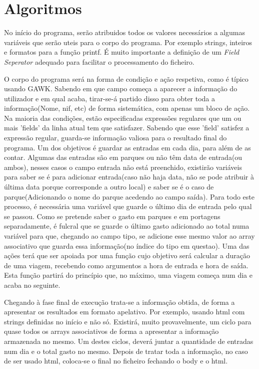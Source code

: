 \documentclass{report}
\def\fs{\emph{Field Seperator}\xspace}
\begin{document}
\section{Algoritmos}
No início do programa, serão atribuidos todos os valores necessários a algumas variáveis que serão uteis para o corpo do programa.
Por exemplo strings, inteiros e formatos para a função printf.
É muito importante a definição de um \fs adequado para facilitar o processamento do ficheiro.\par
O corpo do programa será na forma de condição e ação respetiva, como é típico usando GAWK.
Sabendo em que campo começa a aparecer a informação do utilizador e em qual acaba, tirar-se-á partido disso para obter toda a 
informação(Nome, nif, etc) de forma sistemática, com apenas um bloco de ação.
Na maioria das condições, estão especificadas expressões regulares que um ou mais 'fields' da linha atual tem que satisfazer. 
Sabendo que esse 'field' satisfez a expressão regular, guarda-se informação valiosa para o resultado final do programa. Um dos objetivos é guardar as entradas em cada dia, para além de as contar.
Algumas das entradas são em parques ou não têm data de entrada(ou ambos), nesses casos o campo entrada não
está preenchido, existirão variáveis para saber se é para adicionar entrada(caso não haja data, não se pode atribuir à última data porque corresponde a outro local) e saber se é o caso de parque(Adicionando o nome do 
parque acedendo ao campo saída). Para todo este processo, é necessária uma variável que guarde o último dia de entrada pelo qual se passou.
Como se pretende saber o gasto em parques e em portagens separadamente, é 
fulcral que se guarde o último gasto adicionado ao total numa variável para que, chegando ao campo tipo, se adicione esse mesmo valor 
ao array associativo que guarda essa informação(no índice do tipo em questao).
Uma das ações terá que ser apoiada por uma
função cujo objetivo será calcular a duração de uma viagem, recebendo como
argumentos a hora de entrada e hora de saída. Esta função partirá do 
princípio que, no máximo, uma viagem começa num dia e acaba no seguinte.
\par
Chegando à fase final de execução trata-se a informação obtida, de forma a apresentar os resultados em formato apelativo. Por exemplo, 
usando html com strings definidas no início e não só. Existirá, muito provavelmente, 
um ciclo para quase todos os arrays associativos de forma a apresentar a informação 
armazenada no mesmo. Um destes ciclos, deverá juntar a quantidade de entradas num dia e o total gasto no mesmo.
Depois de tratar toda a informação, no caso de ser usado html, coloca-se o final no ficheiro fechando o body e o html. 
\end{document}
